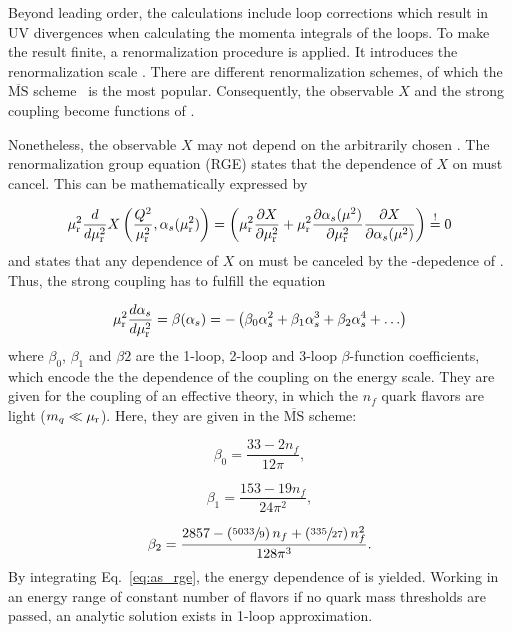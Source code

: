 Beyond leading order, the calculations include loop corrections which result in
UV divergences when calculating the momenta integrals of the loops. To make the
result finite, a renormalization procedure is applied. It introduces the
renormalization scale \mur. There are different renormalization schemes, of
which the $\overline{\mathrm{MS}}$ scheme~\cite{Weinberg:1951ss,tHooft:1973mm}
is the most popular. Consequently, the observable $X$ and the strong coupling
become functions of \mur. 

Nonetheless, the observable $X$ may not depend on the arbitrarily chosen \mur.
The renormalization group equation (RGE) states that the dependence of $X$ on
\mur must cancel. This can be mathematically expressed by

\begin{equation} 
    \mu_{\mathrm{r}}^2 \frac{d}{d \mu_{\mathrm{r}}^2} X \left(\frac{Q^2}{\mu_{\mathrm{r}}^2},\alpha_{s}(\mu_{\mathrm{r}}^2)\right) = \left(
    \mu_{\mathrm{r}}^2 \frac{\partial X}{\partial \mu_{\mathrm{r}}^2} + \mu_{\mathrm{r}}^2 \frac{\partial
    \alpha_{s}(\mu^2)}{\partial \mu_{\mathrm{r}}^2} \frac{\partial X}{\partial \alpha_{s}(\mu^2)} \right) \stackrel{!}{=} 0 
\end{equation}
%
and states that any dependence of $X$ on \mur must be canceled by the
\mur-depedence of \as. Thus, the strong coupling has to fulfill the
equation

\begin{equation}
    \mu_{\mathrm{r}}^2 \frac{d \alpha_{s}}{d \mu_{\mathrm{r}}^2} = \beta(\alpha_{s}) = - \left( \beta_0 \alpha_{s}^2 + \beta_1 \alpha_{s}^3
    + \beta_2 \alpha_{s}^4 + \ldots \right)
    \label{eq:as_rge}
\end{equation}
%
where $\beta_0$, $\beta_1$ and $\beta 2$ are the 1-loop, 2-loop and 3-loop 
$\beta$-function coefficients, which encode the the dependence of the coupling
on the energy scale. They are given for the coupling of an effective
theory, in which the $n_f$ quark flavors are light ($m_q \ll \mu_{\mathrm{r}}$). Here, they
are given in the $\overline{\mathrm{MS}}$ scheme:

\begin{equation} 
    \beta_0 = \frac{33 - 2 n_f}{12\pi},
\end{equation}

\begin{equation} 
    \beta_1 = \frac{153 - 19 n_f}{24\pi^2},
\end{equation}

\begin{equation} 
   \beta_2 = \frac{2857 -\left(\sfrac{5033}{9}\right)n_f + \left(\sfrac{335}{27}
   \right)n_f^2}{128 \pi^3}.
\end{equation}
%
By integrating Eq.~\ref{eq:as_rge}, the energy dependence of \as is yielded.
Working in an energy range of constant number of flavors \ie if no quark mass
thresholds are passed, an analytic solution exists in 1-loop approximation. 

